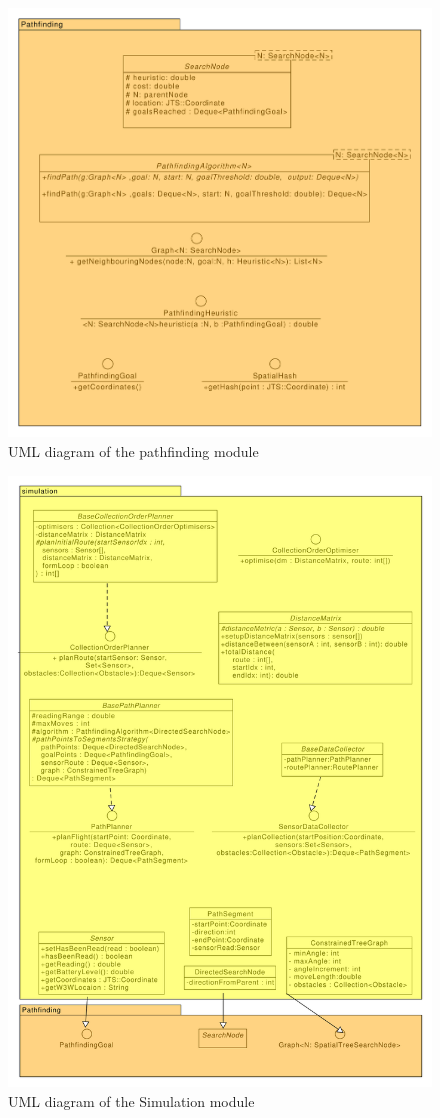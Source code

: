 \documentclass[10pt,a4paper]{article}
\begin{document}
\begin{figure}[H]
    \centering
    \includegraphics[width=0.7\columnwidth]{diagrams/pathfinding.uxf.pdf}
    \caption{UML diagram of the pathfinding module}
    \label{fig:pathfinding}
\end{figure}
\begin{figure}[H]
    \centering
    \includegraphics[width=0.8\columnwidth]{diagrams/simulation.uxf.pdf}
    \caption{UML diagram of the Simulation module}
    \label{fig:simulation}
\end{figure}
\end{document}
